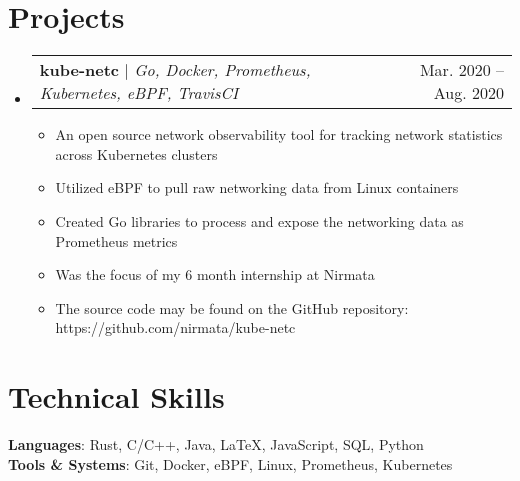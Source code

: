 \documentclass[letterpaper,11pt]{article}
\makeatletter
\newcommand{\resumeItem}[1]{
  \item\small{
    {#1 \vspace{-2pt}}
  }
}
\newcommand{\resumeProjectHeading}[2]{
    \item
    \begin{tabular*}{0.97\textwidth}{l@{\extracolsep{\fill}}r}
      \small#1 & #2 \\
    \end{tabular*}\vspace{-7pt}
}
\newcommand{\resumeSubHeadingListStart}{\begin{itemize}[leftmargin=0.15in, label={}]}
\newcommand{\resumeSubHeadingListEnd}{\end{itemize}}
\newcommand{\resumeItemListStart}{\begin{itemize}}
\newcommand{\resumeItemListEnd}{\end{itemize}\vspace{-5pt}}
\makeatother
\begin{document}
\section{Projects}
    \resumeSubHeadingListStart
      \resumeProjectHeading
          {\textbf{kube-netc} $|$ \emph{Go, Docker, Prometheus, Kubernetes, eBPF, TravisCI}}{Mar. 2020 -- Aug. 2020}
          \resumeItemListStart
            \resumeItem{An open source network observability tool for tracking network statistics across Kubernetes clusters}
            \resumeItem{Utilized eBPF to pull raw networking data from Linux containers}
            \resumeItem{Created Go libraries to process and expose the networking data as Prometheus metrics}
            \resumeItem{Was the focus of my 6 month internship at Nirmata}
            \resumeItem{The source code may be found on the GitHub repository: https://github.com/nirmata/kube-netc}
          \resumeItemListEnd
    \resumeSubHeadingListEnd

%
\section{Technical Skills}
 \begin{itemize}[leftmargin=0.15in, label={}]
    \small{\item{
     \textbf{Languages}{: Rust, C/C++, Java, \LaTeX, JavaScript, SQL, Python} \\
     \textbf{Tools \& Systems}{: Git, Docker, eBPF, Linux, Prometheus, Kubernetes} \\
    }}
 \end{itemize}


\nocite{*}
\printbibliography[title=Publications]
 
\end{document}
